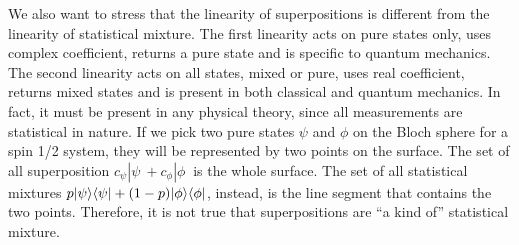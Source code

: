 We also want to stress that the linearity of superpositions is different from the linearity of statistical mixture. The first linearity acts on pure states only, uses complex coefficient, returns a pure state and is specific to quantum mechanics. The second linearity acts on all states, mixed or pure, uses real coefficient, returns mixed states and is present in both classical and quantum mechanics. In fact, it must be present in any physical theory, since all measurements are statistical in nature. If we pick two pure states $\psi$ and $\phi$ on the Bloch sphere for a spin 1/2 system, they will be represented by two points on the surface. The set of all superposition $c_{\psi}|\psi \> + c_{\phi} |\phi\>$ is the whole surface. The set of all statistical mixtures $p| \psi \rangle \langle \psi | + (1-p) | \phi \rangle \langle \phi |$, instead, is the line segment that contains the two points. Therefore, it is not true that superpositions are ``a kind of'' statistical mixture.

